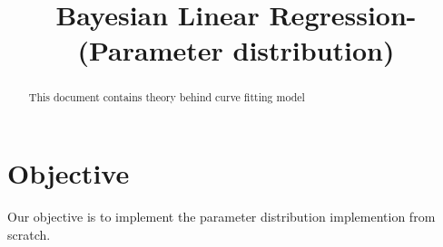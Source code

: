 \documentclass[journal,12pt,twocolumn]{IEEEtran}
\begin{document}
\makeatletter
{}
\makeatother
\let\StandardTheFigure\thefigure
\let\vec\mathbf
\renewcommand{\thefigure}{\theproblem}
\def\putbox#1#2#3{\makebox[0in][l]{\makebox[#1][l]{}\raisebox{\baselineskip}[0in][0in]{\raisebox{#2}[0in][0in]{#3}}}}
     \def\rightbox#1{\makebox[0in][r]{#1}}
     \def\centbox#1{\makebox[0in]{#1}}
     \def\topbox#1{\raisebox{-\baselineskip}[0in][0in]{#1}}
\vspace{3cm}
\title{Bayesian Linear Regression- (Parameter distribution)}
\maketitle
\newpage
\bigskip
\renewcommand{\thefigure}{\theenumi}
\renewcommand{\thetable}{\theenumi}
\begin{abstract}
This document contains theory behind curve fitting model
\end{abstract}
\section{\textbf{Objective}}
Our objective is to implement the parameter distribution  implemention from scratch.
\end{document}
